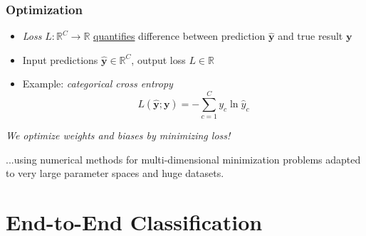 \documentclass[14pt, t]{beamer}
\renewcommand{\vec}[1]{\bm{#1}}
\newcommand{\y}{\vec{y}}
\begin{document}
\begin{frame}
    \frametitle{Optimization}
    \begin{itemize}
    
        \item \textit{Loss} $ L : \mathbb{R}^{C} \to \mathbb{R} $ \underline{quantifies} difference between prediction $ \hat{\y} $ and true result $ \y $

        \item Input predictions $ \hat{\y} \in \mathbb{R}^{C} $, output loss $ L \in \mathbb{R} $

        \item Example: \textit{categorical cross entropy}
        \vspace{-3mm}
        \begin{equation*}
            L(\hat{\y}; \y) = - \sum_{c = 1}^{C} y_{c} \ln \hat{y}_{c}
        \end{equation*}
    \end{itemize}
    \vspace{-5mm}
    \begin{center}
        \textit{We optimize weights and biases by minimizing loss!}
    \end{center}
    \pause
    \vspace{-3mm}
    ...using numerical methods for multi-dimensional minimization problems adapted to very large parameter spaces and huge datasets.
    
\end{frame}

\section{End-to-End Classification}
\end{document}
